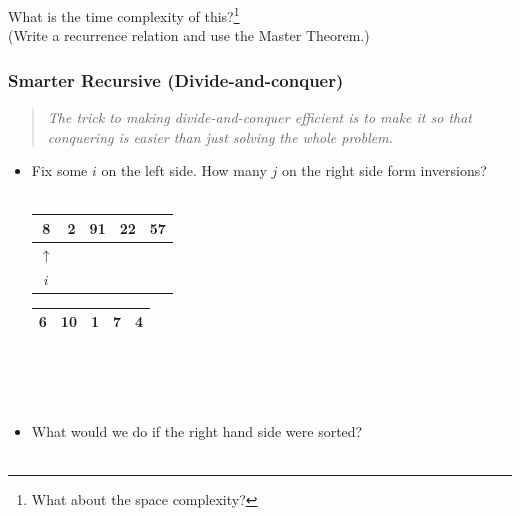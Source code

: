 \documentclass[12pt]{article}
\begin{document}
What is the time complexity of this?\footnote{What about the space complexity?}  \\(Write a recurrence relation and use the Master Theorem.) 



\subsubsection*{Smarter Recursive (Divide-and-conquer)}

\begin{quote}
\it The trick to making divide-and-conquer efficient is to make it so that
conquering is easier than just solving the whole problem.
\end{quote}

\begin{itemize}
    \item Fix some $i$ on the left side. How many $j$ on the right side form
    inversions?\\~ 

    \begin{minipage}{0.5\textwidth}\centering
        \begin{tabular}{|*{5}{c|}}
            \hline
            8 & 2 & 91 & 22 & 57 \\
            \hline
            $\uparrow$ \\
            $i$
          \end{tabular}
        \end{minipage}%
        \begin{minipage}{0.5\textwidth}\centering
          \begin{tabular}{|*{5}{c|}}
            \hline
            6 & 10 & 1 & 7 & 4 \\
            \hline 
           \end{tabular}
           \\~\\~
        \end{minipage}%
    \vspace{.25in}    

    \item What would we do if the right hand side were sorted?\\~


\end{itemize}
\end{document}
